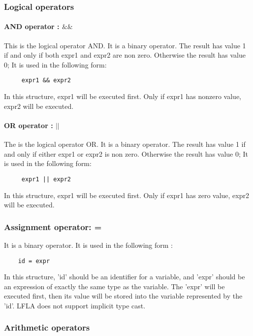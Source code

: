 \documentclass[12pt]{article} %
\begin{document}
\subsubsection{Logical operators}
\paragraph{AND operator :  $\&\&$ }
This is the logical operator AND.  It is a binary  operator. The result has value 1 if and only if both expr1 and expr2 are non zero. Otherwise the result has value 0;  It is used in the following form:
\begin{lstlisting}
     expr1 && expr2 
\end{lstlisting}
In this structure, expr1 will be executed first. Only if expr1 has nonzero value, expr2 will be executed.
\paragraph{OR operator : $||$ }
The is the logical operator OR.  It is a binary operator. The result has value 1 if and only if either expr1 or expr2  is non zero. Otherwise the result has value 0; It is used in the following form:
\begin{lstlisting}
     expr1 || expr2 
\end{lstlisting}
In this structure, expr1 will be executed first. Only if expr1 has  zero value, expr2 will be executed.
\subsubsection{Assignment operator: =}
It is a binary operator. It is used in the following form :
\begin{lstlisting}
    id = expr 
\end{lstlisting}
In this structure, 'id'  should be an identifier for a variable, and 'expr' should be an expression of exactly the same type as the variable. The 'expr' will be executed first, then its value will be stored into the variable represented by the 'id'.  LFLA does not support implicit type cast.
\subsubsection{Arithmetic operators}
\end{document}
